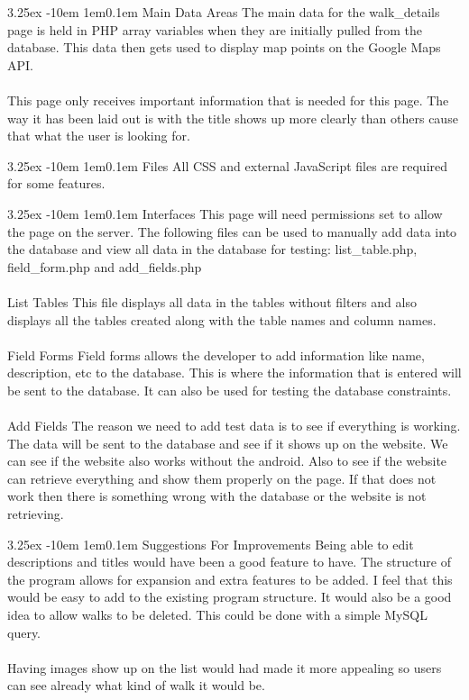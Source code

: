 \documentclass[12pt]{article}
\makeatletter
\renewcommand{\paragraph}{
  \@startsection{paragraph}{4}
  {\z@}{3.25ex \@plus -10em \@minus 1em}{0.1em}
  {\normalfont\normalsize\bfseries}
}
\makeatother
\begin{document}
\paragraph{Main Data Areas}
The main data for the walk\_details page is held in PHP array variables when they are initially pulled from the database. This data then gets used to display map points on the Google Maps API.
~\\\\
This page only receives important information that is needed for this page.  The way it has been laid out is with the title shows up more clearly than others cause that what the user is looking for.
\paragraph{Files}
All CSS and external JavaScript files are required for some features.
\paragraph{Interfaces}
This page will need permissions set to allow the page on the server.
\newline
The following files can be used to manually add data into the database and view all data in the database for testing: list\_table.php, field\_form.php and add\_fields.php
~\\\\
List Tables
\newline
This file displays all data in the tables without filters and also displays all the tables created along with the table names and column names.
~\\\\
Field Forms
\newline
Field forms allows the developer to add information like name, description, etc to the database. This is where the information that is entered will be sent to the database. It can also be used for testing the database constraints.
~\\\\
Add Fields
\newline
The reason we need to add test data is to see if everything is working. The data will be sent to the database and see if it shows up on the website. We can see if the website also works without the android. Also to see if the website can retrieve everything and show them properly on the page. If that does not work then there is something wrong with the database or the website is not retrieving.
\paragraph{Suggestions For Improvements}
Being able to edit descriptions and titles would have been a good feature to have. The structure of the program allows for expansion and extra features to be added. I feel that this would be easy to add to the existing program structure. It would also be a good idea to allow walks to be deleted. This could be done with a simple MySQL query.
~\\\\
Having images show up on the list would had made it more appealing so users can see already what kind of walk it would be.
\end{document}
